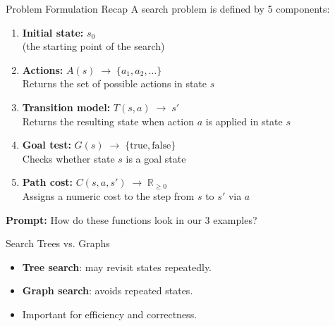 \documentclass[aspectratio=169]{beamer}
\begin{document}
\begin{frame}{Problem Formulation Recap}
  A search problem is defined by 5 components:

  \begin{enumerate}
    \item \textbf{Initial state:} $s_0$ \\
          (the starting point of the search)

    \item \textbf{Actions:} $A(s) \;\to\; \{a_1, a_2, \dots\}$ \\
          Returns the set of possible actions in state $s$

    \item \textbf{Transition model:} $T(s,a) \;\to\; s'$ \\
          Returns the resulting state when action $a$ is applied in state $s$

    \item \textbf{Goal test:} $G(s) \;\to\; \{\text{true}, \text{false}\}$ \\
          Checks whether state $s$ is a goal state

    \item \textbf{Path cost:} $C(s,a,s') \;\to\; \mathbb{R}_{\geq 0}$ \\
          Assigns a numeric cost to the step from $s$ to $s'$ via $a$
  \end{enumerate}

  \vspace{0.2cm}
  \textbf{Prompt:} How do these functions look in our 3 examples?
\end{frame}

\begin{frame}{Search Trees vs. Graphs}
  \begin{minipage}{0.55\textwidth}
    \begin{itemize}
      \item \textbf{Tree search}: may revisit states repeatedly.
      \item \textbf{Graph search}: avoids repeated states.
      \item Important for efficiency and correctness.
    \end{itemize}
  \end{minipage}%
  \begin{minipage}{0.43\textwidth}
  \end{minipage}
\end{frame}
\end{document}
